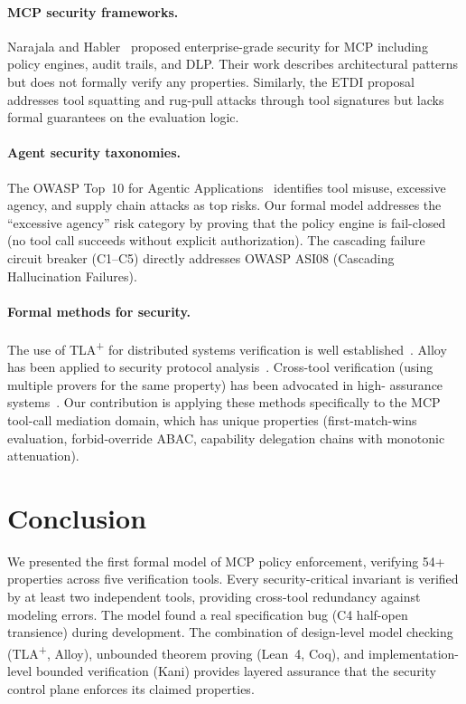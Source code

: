 \documentclass[sigplan,screen,nonacm]{acmart}
\newcommand{\tlaplus}{TLA\textsuperscript{+}\xspace}
\begin{document}
\paragraph{MCP security frameworks.}
Narajala and Habler~\cite{narajala2024} proposed enterprise-grade security for
MCP including policy engines, audit trails, and DLP. Their work describes
architectural patterns but does not formally verify any properties. Similarly,
the ETDI proposal~\cite{etdi2025} addresses tool squatting and rug-pull
attacks through tool signatures but lacks formal guarantees on the evaluation
logic.

\paragraph{Agent security taxonomies.}
The OWASP Top~10 for Agentic Applications~\cite{owasp2026} identifies tool
misuse, excessive agency, and supply chain attacks as top risks. Our formal
model addresses the ``excessive agency'' risk category by proving that the
policy engine is fail-closed (no tool call succeeds without explicit
authorization). The cascading failure circuit breaker (C1--C5) directly
addresses OWASP ASI08 (Cascading Hallucination Failures).

\paragraph{Formal methods for security.}
The use of \tlaplus for distributed systems verification is well
established~\cite{lamport2002,newcombe2015}. Alloy has been applied to
security protocol analysis~\cite{jackson2006}. Cross-tool verification
(using multiple provers for the same property) has been advocated in high-
assurance systems~\cite{klein2009}. Our contribution is applying these
methods specifically to the MCP tool-call mediation domain, which has
unique properties (first-match-wins evaluation, forbid-override ABAC,
capability delegation chains with monotonic attenuation).


\section{Conclusion}
\label{sec:conclusion}

We presented the first formal model of MCP policy enforcement, verifying
54+ properties across five verification tools. Every security-critical
invariant is verified by at least two independent tools, providing
cross-tool redundancy against modeling errors. The model found a real
specification bug (C4 half-open transience) during development. The
combination of design-level model checking (\tlaplus, Alloy), unbounded
theorem proving (Lean~4, Coq), and implementation-level bounded verification
(Kani) provides layered assurance that the security control plane enforces
its claimed properties.
\end{document}
